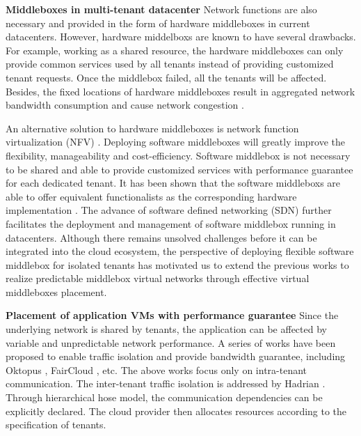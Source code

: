 \documentclass[review]{elsarticle}
\begin{document}
\textbf{Middleboxes in multi-tenant datacenter }
Network functions are also necessary and provided in the form of hardware middleboxes in current datacenters.  However, hardware middelboxs are known to have several drawbacks. For example, working as a shared resource, the hardware middleboxes can only provide common services used by all tenants instead of providing customized tenant requests. Once the middlebox failed, all the tenants will be affected. Besides, the fixed locations of hardware middleboxes result in aggregated network bandwidth consumption and cause network congestion \cite{ClickOS, Y15NFV}. 

An alternative solution to hardware middleboxes is network function virtualization (NFV) \cite{NFV}. Deploying software middleboxes will greatly improve the flexibility, manageability and cost-efficiency. Software middlebox is not necessary to be shared and able to provide customized services with performance guarantee for each dedicated tenant. It has been shown that the software middleboxs are able to offer equivalent functionalists as the corresponding hardware implementation \cite{D12tpp, S12dai, G13dio, ClickOS}. The advance of software defined networking (SDN) further facilitates the deployment and management of software middlebox running in datacenters. Although there remains unsolved challenges before it can be integrated into the cloud ecosystem, the perspective of deploying flexible software middlebox for isolated tenants has motivated us to extend the previous works to realize predictable middlebox virtual networks through effective virtual middleboxes placement.


\textbf{Placement of application VMs with performance guarantee}
Since the underlying network is shared by tenants, the application can be affected by variable and unpredictable network performance. A series of works have been proposed to enable traffic isolation and provide bandwidth guarantee, including Oktopus \cite{B11tpd}, FairCloud \cite{P12fst}, etc. The above works focus only on intra-tenant communication. The inter-tenant traffic isolation is addressed by Hadrian \cite{B13cta}. Through hierarchical hose model, the communication dependencies can be explicitly declared. The cloud provider then allocates resources according to the specification of tenants. 
\end{document}
